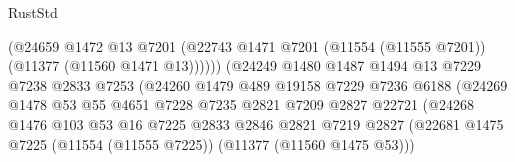 \begin{lexlean}{RustStd}
\begin{coremodule}
                                          (@24659
                                            @1472
                                            @13
                                            @7201
                                            (@22743
                                              @1471
                                              @7201
                                              (@11554 (@11555 @7201))
                                              (@11377 (@11560 @1471 @13))))))
                                      (@24249
                                        @1480
                                        @1487
                                        @1494
                                        @13
                                        @7229
                                        @7238
                                        @2833
                                        @7253
                                        (@24260
                                          @1479
                                          @489
                                          @19158
                                          @7229
                                          @7236
                                          @6188
                                          (@24269
                                            @1478
                                            @53
                                            @55
                                            @4651
                                            @7228
                                            @7235
                                            @2821
                                            @7209
                                            @2827
                                            @22721
                                            (@24268
                                              @1476
                                              @103
                                              @53
                                              @16
                                              @7225
                                              @2833
                                              @2846
                                              @2821
                                              @7219
                                              @2827
                                              (@22681
                                                @1475
                                                @7225
                                                (@11554 (@11555 @7225))
                                                (@11377 (@11560 @1475 @53)))

\end{coremodule}
\end{lexlean}

